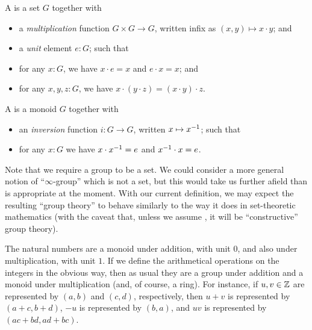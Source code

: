 %

\begin{defn}
  A 
  is a set $G$ together with
  \begin{itemize}
  \item a \emph{multiplication}
    function $G\times G\to G$, written infix as $(x,y) \mapsto x\cdot y$; and
  \item a \emph{unit}
    element $e:G$; such that
  \item for any $x:G$, we have $x\cdot e = x$ and $e\cdot x = x$; and
  \item for any $x,y,z:G$, we have $x\cdot (y\cdot z) = (x\cdot y)\cdot z$.
  \end{itemize}
  A 
  is a monoid $G$ together with
  \begin{itemize}
  \item an \emph{inversion} function $i:G\to G$, written $x\mapsto \mathord{{x}^{-1}}$; such that
  \item for any $x:G$ we have $x\cdot \mathord{{x}^{-1}} = e$ and $\mathord{{x}^{-1}} \cdot x = e$.
  \end{itemize}
\end{defn}

\begin{rmk}\label{rmk:infty-group}
Note that we require a group to be a set.
We could consider a more general notion of ``$\infty$-group''%
which is not a set, but this would take us further afield than is appropriate at the moment.
With our current definition, we may expect the resulting ``group theory'' to behave similarly to the way it does in set-theoretic mathematics (with the caveat that, unless we assume \LEM{}, it will be ``constructive'' group theory).
\end{rmk}

\begin{eg}
  The natural numbers \N are a monoid under addition, with unit $0$, and also under multiplication, with unit $1$.
  If we define the arithmetical operations on the integers \Z in the obvious way, then as usual they are a group under addition and a monoid under multiplication (and, of course, a ring).
  For instance, if $u, v \in \mathbb{Z}$ are represented by $(a,b)$ and $(c,d)$, respectively, then $u + v$ is represented by $(a + c, b + d)$, $-u$ is represented by $(b, a)$, and $u v$ is represented by $(a c + b d, a d + b c)$.
\end{eg}

